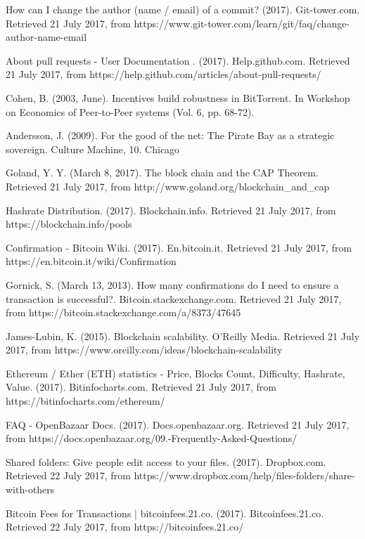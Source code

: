 \begin{thebibliography}{99}
How can I change the author (name / email) of a commit? (2017). Git-tower.com. Retrieved 21 July 2017, from https://www.git-tower.com/learn/git/faq/change-author-name-email

About pull requests - User Documentation . (2017). Help.github.com. Retrieved 21 July 2017, from https://help.github.com/articles/about-pull-requests/

Cohen, B. (2003, June). Incentives build robustness in BitTorrent. In Workshop on Economics of Peer-to-Peer systems (Vol. 6, pp. 68-72).

Andersson, J. (2009). For the good of the net: The Pirate Bay as a strategic sovereign. Culture Machine, 10.
Chicago 

Goland, Y. Y. (March 8, 2017). The block chain and the CAP Theorem. Retrieved 21 July 2017, from http://www.goland.org/blockchain\_and\_cap

Hashrate Distribution. (2017). Blockchain.info. Retrieved 21 July 2017, from https://blockchain.info/pools

Confirmation - Bitcoin Wiki. (2017). En.bitcoin.it. Retrieved 21 July 2017, from https://en.bitcoin.it/wiki/Confirmation

Gornick, S. (March 13, 2013). How many confirmations do I need to ensure a transaction is successful?. Bitcoin.stackexchange.com. Retrieved 21 July 2017, from https://bitcoin.stackexchange.com/a/8373/47645

James-Lubin, K. (2015). Blockchain scalability. O'Reilly Media. Retrieved 21 July 2017, from https://www.oreilly.com/ideas/blockchain-scalability

Ethereum / Ether (ETH) statistics - Price, Blocks Count, Difficulty, Hashrate, Value. (2017). Bitinfocharts.com. Retrieved 21 July 2017, from https://bitinfocharts.com/ethereum/

FAQ - OpenBazaar Docs. (2017). Docs.openbazaar.org. Retrieved 21 July 2017, from https://docs.openbazaar.org/09.-Frequently-Asked-Questions/

Shared folders: Give people edit access to your files. (2017). Dropbox.com. Retrieved 22 July 2017, from https://www.dropbox.com/help/files-folders/share-with-others

Bitcoin Fees for Transactions | bitcoinfees.21.co. (2017). Bitcoinfees.21.co. Retrieved 22 July 2017, from https://bitcoinfees.21.co/


\end{thebibliography}
